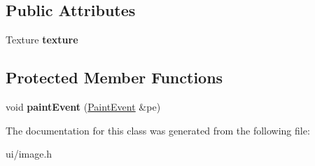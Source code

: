 \subsection*{Public Attributes}
\begin{DoxyCompactItemize}
\item 
\hypertarget{class_tempest_1_1_image_a96077ffe91e97fd914a9f993d3c901bb}{Texture {\bfseries texture}}\label{class_tempest_1_1_image_a96077ffe91e97fd914a9f993d3c901bb}

\end{DoxyCompactItemize}
\subsection*{Protected Member Functions}
\begin{DoxyCompactItemize}
\item 
\hypertarget{class_tempest_1_1_image_ad9bd93e8a170f239299ffb008fe477b6}{void {\bfseries paint\+Event} (\hyperlink{class_tempest_1_1_paint_event}{Paint\+Event} \&pe)}\label{class_tempest_1_1_image_ad9bd93e8a170f239299ffb008fe477b6}

\end{DoxyCompactItemize}


The documentation for this class was generated from the following file\+:\begin{DoxyCompactItemize}
\item 
ui/image.\+h\end{DoxyCompactItemize}

